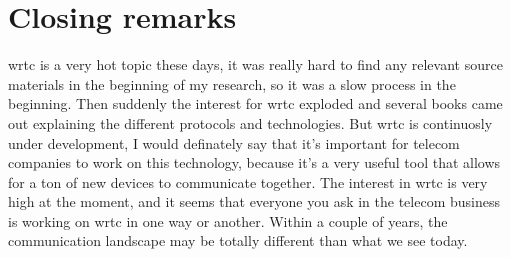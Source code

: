 \section{Closing remarks}
\gls{wrtc} is a very hot topic these days, it was really hard to find any relevant source materials in the beginning of my research, so it was a slow process in the beginning. Then suddenly the interest for \gls{wrtc} exploded and several books came out explaining the different protocols and technologies. But \gls{wrtc} is continuosly under development, I would definately say that it's important for telecom companies to work on this technology, because it's a very useful tool that allows for a ton of new devices to communicate together. The interest in \gls{wrtc} is very high at the moment, and it seems that everyone you ask in the telecom business is working on \gls{wrtc} in one way or another. Within a couple of years, the communication landscape may be totally different than what we see today.